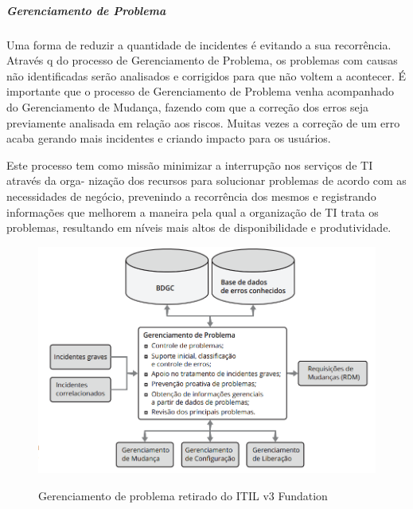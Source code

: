 \subparagraph{Gerenciamento de Problema}
Uma forma de reduzir a quantidade de incidentes é evitando a sua recorrência. Através q
do processo de Gerenciamento de Problema, os problemas com causas não identificadas
serão analisados e corrigidos para que não voltem a acontecer.
É importante que o processo de Gerenciamento de Problema venha acompanhado do
Gerenciamento de Mudança, fazendo com que a correção dos erros seja previamente
analisada em relação aos riscos. Muitas vezes a correção de um erro acaba gerando mais
incidentes e criando impacto para os usuários.

Este processo tem como missão minimizar a interrupção nos serviços de TI através da orga-
nização dos recursos para solucionar problemas de acordo com as necessidades de negócio,
prevenindo a recorrência dos mesmos e registrando informações que melhorem a maneira
pela qual a organização de TI trata os problemas, resultando em níveis mais altos de disponibilidade e produtividade.

\begin{figure}[!h]
\caption{Gerenciamento de problema retirado do ITIL v3 Fundation}
\centering %
\includegraphics[width=15cm]{itil_images/gerenciamento_de_problema.png}
\label{figura:Gerenciamento de problemas retirado do ITIL v3 Fundation}
\end{figure}

